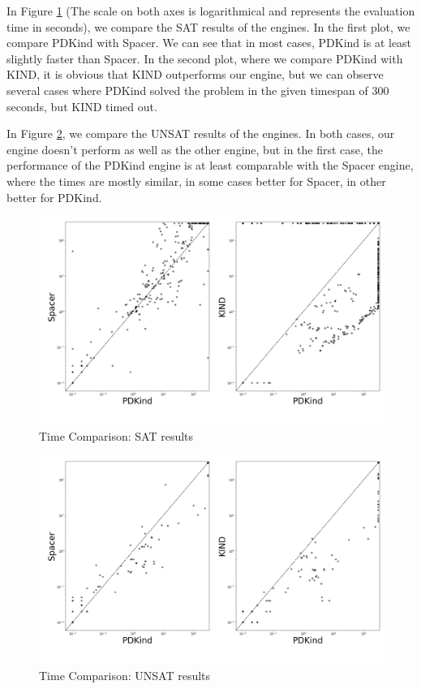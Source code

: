 In Figure \ref{fig:sat_indet_comparison} (The scale on both axes is logarithmical and represents the evaluation time in seconds), we compare the SAT results of the engines. In the first plot, we compare PDKind with Spacer. We can see that in most cases, PDKind is at least slightly faster than Spacer. In the second plot, where we compare PDKind with KIND, it is obvious that KIND outperforms our engine, but we can observe several cases where PDKind solved the problem in the given timespan of 300 seconds, but KIND timed out.

In Figure \ref{fig:unsat_indet_comparison}, we compare the UNSAT results of the engines. In both cases, our engine doesn't perform as well as the other engine, but in the first case, the performance of the PDKind engine is at least comparable with the Spacer engine, where the times are mostly similar, in some cases better for Spacer, in other better for PDKind.

\renewcommand{\figurename}{Figure}
\begin{figure}[h!]
    \centering
    \includegraphics[width=\textwidth]{img/golem_sat_scatter.png}
    \caption{Time Comparison: SAT results}
    \label{fig:sat_indet_comparison}
\end{figure}

\begin{figure}[h!]
    \centering
    \includegraphics[width=\textwidth]{img/golem_unsat_scatter.png}
    \caption{Time Comparison: UNSAT results}
    \label{fig:unsat_indet_comparison}
\end{figure}

